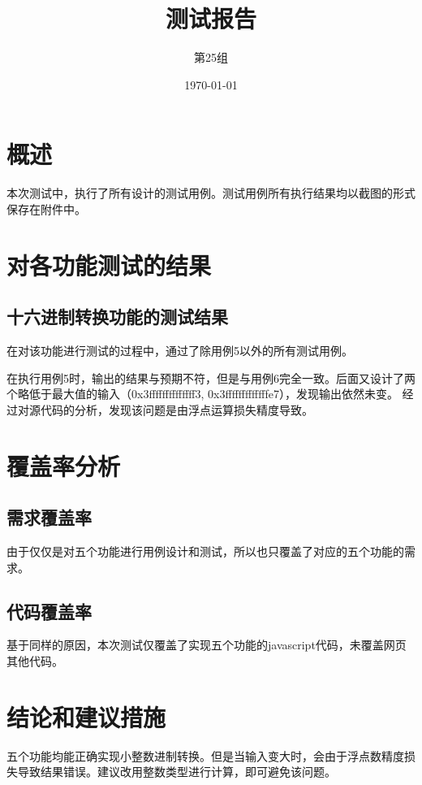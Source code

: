\documentclass[12pt, a4paper, oneside]{ctexart}
\title{\textbf{测试报告}}
\author{第25组}
\date{\today}
\begin{document}
\maketitle

\section{概述}
本次测试中，执行了所有设计的测试用例。测试用例所有执行结果均以截图的形式保存在附件中。

\section{对各功能测试的结果}
\subsection{十六进制转换功能的测试结果}
在对该功能进行测试的过程中，通过了除用例5以外的所有测试用例。

在执行用例5时，输出的结果与预期不符，但是与用例6完全一致。后面又设计了两个略低于最大值的输入（0x3ffffffffffffff3, 0x3fffffffffffffe7），发现输出依然未变。
经过对源代码的分析，发现该问题是由浮点运算损失精度导致。

\section{覆盖率分析}
\subsection{需求覆盖率}
由于仅仅是对五个功能进行用例设计和测试，所以也只覆盖了对应的五个功能的需求。

\subsection{代码覆盖率}
基于同样的原因，本次测试仅覆盖了实现五个功能的javascript代码，未覆盖网页其他代码。

\section{结论和建议措施}
五个功能均能正确实现小整数进制转换。但是当输入变大时，会由于浮点数精度损失导致结果错误。建议改用整数类型进行计算，即可避免该问题。
\end{document}
